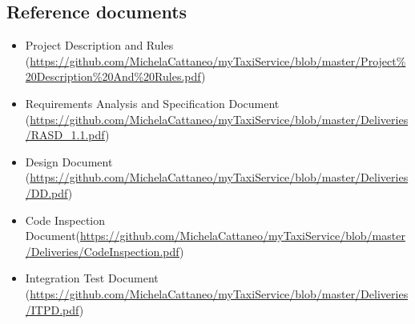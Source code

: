 	\newpage
	\subsection{Reference documents}
		\begin{itemize}
			\item Project Description and Rules (\url{https://github.com/MichelaCattaneo/myTaxiService/blob/master/Project\%20Description\%20And\%20Rules.pdf})
			\item Requirements Analysis and Specification Document (\url{https://github.com/MichelaCattaneo/myTaxiService/blob/master/Deliveries/RASD_1.1.pdf})
			\item Design Document (\url{https://github.com/MichelaCattaneo/myTaxiService/blob/master/Deliveries/DD.pdf})
			\item Code Inspection Document(\url{https://github.com/MichelaCattaneo/myTaxiService/blob/master/Deliveries/CodeInspection.pdf})
			\item Integration Test Document (\url{https://github.com/MichelaCattaneo/myTaxiService/blob/master/Deliveries/ITPD.pdf})
		\end{itemize}